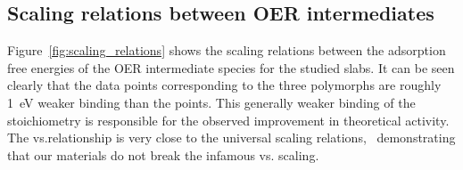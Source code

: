 \subsection{Scaling relations between OER intermediates}
%

%
%
Figure~\ref{fig:scaling_relations} shows the scaling relations between the adsorption free energies of the OER intermediate species for the studied \IrOx slabs.
%
It can be seen clearly that the data points corresponding to the three \IrOthree polymorphs are roughly \SI{1}{\electronvolt} weaker binding than the \rIrOtwo points.
%
This generally weaker binding of the \IrOthree stoichiometry is responsible for the observed improvement in theoretical activity.
%
The \DGOOH vs.\DGOH relationship is very close to the universal scaling relations,~\cite{Man2011}
demonstrating that our materials do not break the infamous \DGOOH vs. \DGOH scaling.



